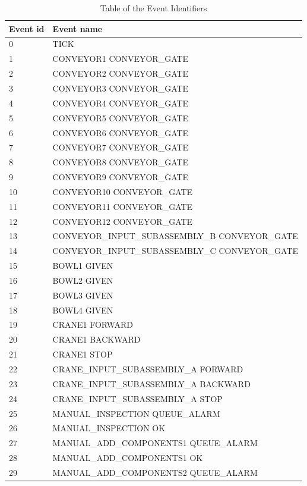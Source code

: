 \documentclass[journal]{IEEEtran}
\begin{document}
\begin{table}[!t]
\caption{Table of the Event Identifiers}
\label{eventids}
\centering
\begin{tabular}{|p{5mm}|p{55mm}|}
\hline
Event id & Event name \\
\hline
\hline
0 & TICK \\
\hline
1 & CONVEYOR1 CONVEYOR\_GATE \\
\hline
2 & CONVEYOR2 CONVEYOR\_GATE \\
\hline
3 & CONVEYOR3 CONVEYOR\_GATE \\
\hline
4 & CONVEYOR4 CONVEYOR\_GATE \\
\hline
5 & CONVEYOR5 CONVEYOR\_GATE \\
\hline
6 & CONVEYOR6 CONVEYOR\_GATE \\
\hline
7 & CONVEYOR7 CONVEYOR\_GATE \\
\hline
8 & CONVEYOR8 CONVEYOR\_GATE \\
\hline
9 & CONVEYOR9 CONVEYOR\_GATE \\
\hline
10 & CONVEYOR10 CONVEYOR\_GATE \\
\hline
11 & CONVEYOR11 CONVEYOR\_GATE \\
\hline
12 & CONVEYOR12 CONVEYOR\_GATE \\
\hline
13 & CONVEYOR\_INPUT\_SUBASSEMBLY\_B CONVEYOR\_GATE \\
\hline
14 & CONVEYOR\_INPUT\_SUBASSEMBLY\_C CONVEYOR\_GATE \\
\hline
15 & BOWL1 GIVEN \\
\hline
16 & BOWL2 GIVEN \\
\hline
17 & BOWL3 GIVEN \\
\hline
18 & BOWL4 GIVEN \\
\hline
19 & CRANE1 FORWARD \\
\hline
20 & CRANE1 BACKWARD \\
\hline
21 & CRANE1 STOP \\
\hline
22 & CRANE\_INPUT\_SUBASSEMBLY\_A FORWARD \\
\hline
23 & CRANE\_INPUT\_SUBASSEMBLY\_A BACKWARD \\
\hline
24 & CRANE\_INPUT\_SUBASSEMBLY\_A STOP \\
\hline
25 & MANUAL\_INSPECTION QUEUE\_ALARM \\
\hline
26 & MANUAL\_INSPECTION OK \\
\hline
27 & MANUAL\_ADD\_COMPONENTS1 QUEUE\_ALARM \\
\hline
28 & MANUAL\_ADD\_COMPONENTS1 OK \\
\hline
29 & MANUAL\_ADD\_COMPONENTS2 QUEUE\_ALARM \\

\end{tabular}
\end{table}
\end{document}

